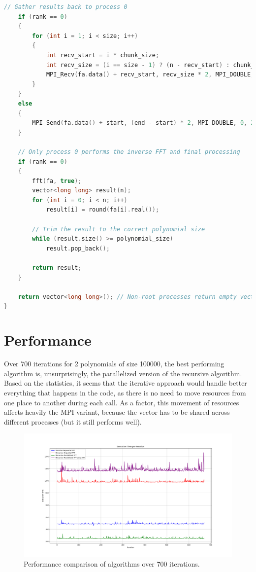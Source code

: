 \documentclass[12pt]{article}
\theoremstyle{definition}
\begin{document}
\begin{lstlisting}[language=C++, caption={FFT iterative parallelized implementation using MPI.}]
    // Gather results back to process 0
    if (rank == 0)
    {
        for (int i = 1; i < size; i++)
        {
            int recv_start = i * chunk_size;
            int recv_size = (i == size - 1) ? (n - recv_start) : chunk_size;
            MPI_Recv(fa.data() + recv_start, recv_size * 2, MPI_DOUBLE, i, 2, MPI_COMM_WORLD, MPI_STATUS_IGNORE);
        }
    }
    else
    {
        MPI_Send(fa.data() + start, (end - start) * 2, MPI_DOUBLE, 0, 2, MPI_COMM_WORLD);
    }

    // Only process 0 performs the inverse FFT and final processing
    if (rank == 0)
    {
        fft(fa, true);
        vector<long long> result(n);
        for (int i = 0; i < n; i++)
            result[i] = round(fa[i].real());

        // Trim the result to the correct polynomial size
        while (result.size() >= polynomial_size)
            result.pop_back();

        return result;
    }

    return vector<long long>(); // Non-root processes return empty vector
}

\end{lstlisting}
\section{Performance}
Over 700 iterations for 2 polynomials of size 100000, the best performing algorithm is, unsurprisingly, the parallelized version of the recursive algorithm. Based on the statistics, it seems that the iterative approach would handle better everything that happens in the code, as there is no need to move resources from one place to another during each call. As a factor, this movement of resources affects heavily the MPI variant, because the vector has to be shared across different processes (but it still performs well).

\begin{figure}[H]
    \centering
    \includegraphics[width=\textwidth]{execution.png} %
    \caption{Performance comparison of algorithms over 700 iterations.}
    \label{fig:execution}
\end{figure}
\end{document}
